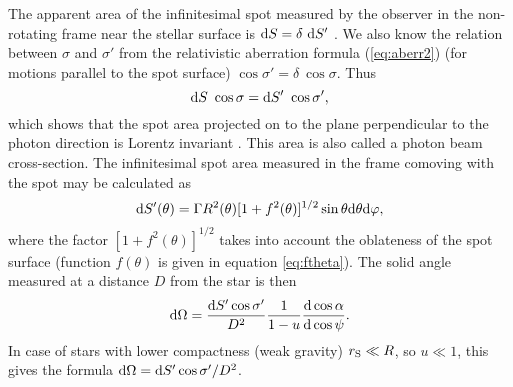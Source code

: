 \documentclass{wihuri}
\def\rg{r_{\rm S}} %
\def\be{\begin{equation}}
\def\ee{\end{equation}}
\def\d{{\rm d}}
\def\rg{r_{\rm S}} %
\def\Dop{\delta}
\begin{document}
The apparent area of the infinitesimal spot measured by the observer in the non-rotating frame near the stellar surface %
is $\d S=\Dop\ \d S'$ \cite{terrell} \cite{lightman75}.
We also know the relation between $\sigma$ and $\sigma'$ from the relativistic aberration formula (\ref{eq:aberr2}) (for motions parallel to the spot surface) $\cos\sigma' =   \Dop \ \cos\sigma$. Thus 
\be \label{eq:Salpha2}
\d S\ \cos\sigma = \d S'\ \cos\sigma', 
\ee
which shows that the spot area projected on to the plane perpendicular to the photon direction is Lorentz invariant \cite{lightman75} \cite{lindbland85}. %
This area is also called a photon beam cross-section.
The infinitesimal spot area measured in the frame comoving with the spot may be calculated as \cite{morsink} %
\be \label{eq:surf_element}
\d S'(\theta) = \Gamma R^{2}(\theta) [1+f^{2}(\theta)]^{1/2} \sin \theta \d \theta \d \varphi,
\ee
where the factor $[1+f^{2}(\theta)]^{1/2}$ takes into account the oblateness of the spot surface (function $f(\theta)$ is given in equation \ref{eq:ftheta}).
The solid angle measured at a distance $D$ from the star is then \cite{morsink}
\be\label{eq:omega2}
 \d\Omega=\frac{\d S' \cos \sigma'}{D^2} \frac{1}{1-u} \frac{\d\cos\alpha}{\d\cos\psi}.
\ee
In case of stars with lower compactness (weak gravity) $\rg \ll R$, so $u\ll 1$, this gives the formula $\d\Omega=\d S' \cos \sigma'/D^2$. 

\end{document}
